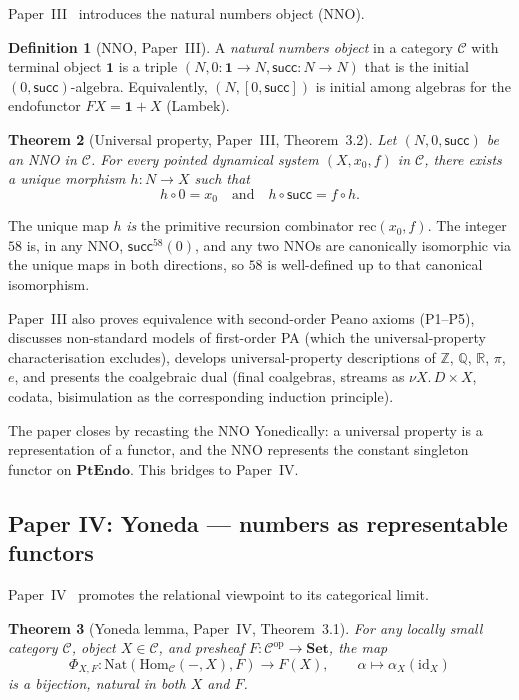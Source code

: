 \documentclass[12pt]{article}
\newtheorem{theorem}{Theorem}[section]
\theoremstyle{definition}
\newtheorem{definition}[theorem]{Definition}
\theoremstyle{remark}
\newcommand{\Z}{\mathbb{Z}}
\newcommand{\Q}{\mathbb{Q}}
\newcommand{\R}{\mathbb{R}}
\newcommand{\Set}{\mathbf{Set}}
\newcommand{\PtEndo}{\mathbf{PtEndo}}
\newcommand{\op}{^{\mathrm{op}}}
\newcommand{\id}{\mathrm{id}}
\newcommand{\Hom}{\mathrm{Hom}}
\newcommand{\Nat}{\mathrm{Nat}}
\newcommand{\suc}{\mathsf{succ}}
\begin{document}
Paper~III~\cite{paper-iii} introduces the natural numbers object (NNO).

\begin{definition}[NNO, Paper~III]
\label{def:nno}
A \emph{natural numbers object} in a category $\mathcal{C}$ with terminal
object $\mathbf{1}$ is a triple $(N, 0\colon \mathbf{1} \to N,
\suc\colon N \to N)$ that is the initial $(0, \suc)$-algebra. Equivalently,
$(N, [0, \suc])$ is initial among algebras for the endofunctor
$F X = \mathbf{1} + X$ (Lambek).
\end{definition}

\begin{theorem}[Universal property, Paper~III, Theorem~3.2]
\label{thm:nno-up}
Let $(N, 0, \suc)$ be an NNO in $\mathcal{C}$. For every pointed dynamical
system $(X, x_0, f)$ in $\mathcal{C}$, there exists a unique morphism
$h\colon N \to X$ such that
\[
h \circ 0 = x_0 \quad \text{and} \quad h \circ \suc = f \circ h.
\]
\end{theorem}

The unique map $h$ \emph{is} the primitive recursion combinator
$\mathrm{rec}(x_0, f)$. The integer $58$ is, in any NNO,
$\suc^{58}(0)$, and any two NNOs are canonically isomorphic via the unique
maps in both directions, so $58$ is well-defined up to that canonical
isomorphism.

Paper~III also proves equivalence with second-order Peano axioms
(P1--P5), discusses non-standard models of first-order PA (which the
universal-property characterisation excludes), develops universal-property
descriptions of $\Z$, $\Q$, $\R$, $\pi$, $e$, and presents the coalgebraic
dual (final coalgebras, streams as $\nu X.\, D \times X$, codata,
bisimulation as the corresponding induction principle).

The paper closes by recasting the NNO Yonedically: a universal property is
a representation of a functor, and the NNO represents the constant singleton
functor on $\PtEndo$. This bridges to Paper~IV.

\subsection{Paper IV: Yoneda --- numbers as representable functors}
\label{sec:row-iv}

Paper~IV~\cite{paper-iv} promotes the relational viewpoint to its
categorical limit.

\begin{theorem}[Yoneda lemma, Paper~IV, Theorem~3.1]
\label{thm:yoneda}
For any locally small category $\mathcal{C}$, object $X \in \mathcal{C}$,
and presheaf $F\colon \mathcal{C}\op \to \Set$, the map
\[
\Phi_{X,F}\colon \Nat(\Hom_{\mathcal{C}}(-, X), F) \to F(X), \qquad
\alpha \mapsto \alpha_X(\id_X)
\]
is a bijection, natural in both $X$ and $F$.
\end{theorem}
\end{document}
